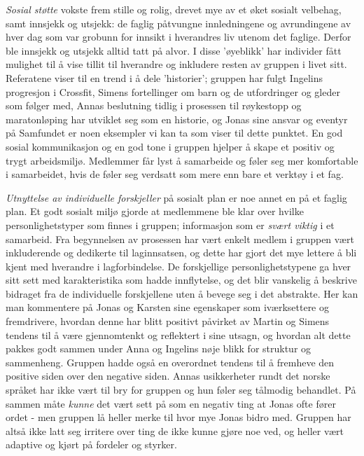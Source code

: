 \emph{Sosial støtte} vokste frem stille og rolig, drevet mye av et øket sosialt velbehag, samt innsjekk og utsjekk: de faglig påtvungne innledningene og avrundingene av hver dag som var grobunn for innsikt i hverandres liv utenom det faglige. Derfor ble innsjekk og utsjekk alltid tatt på alvor. I disse 'øyeblikk' har individer fått mulighet til å vise tillit til hverandre og inkludere resten av gruppen i livet sitt. Referatene viser til en trend i å dele 'historier'; gruppen har fulgt Ingelins progresjon i Crossfit, Simens fortellinger om barn og de utfordringer og gleder som følger med, Annas beslutning tidlig i prosessen til røykestopp og maratonløping har utviklet seg som en historie, og Jonas sine ansvar og eventyr på Samfundet er noen eksempler vi kan ta som viser til dette punktet. En god sosial kommunikasjon og en god tone i gruppen hjelper å skape et positiv og trygt arbeidsmiljø\cite{happy}. Medlemmer får lyst å samarbeide og føler seg mer komfortable i samarbeidet, hvis de føler seg verdsatt som mere enn bare et verktøy i et fag.

\emph{Utnyttelse av individuelle forskjeller} på sosialt plan er noe annet en på et faglig plan. Et godt sosialt miljø gjorde at medlemmene ble klar over hvilke personlighetstyper som finnes i gruppen; informasjon som er \emph{svært viktig} i et samarbeid. Fra begynnelsen av prosessen har vært enkelt medlem i gruppen vært inkluderende og dedikerte til laginnsatsen, og dette har gjort det mye lettere å bli kjent med hverandre i lagforbindelse. De forskjellige personlighetstypene ga hver sitt sett med karakteristika som hadde innflytelse, og det blir vanskelig å beskrive bidraget fra de individuelle forskjellene uten å bevege seg i det abstrakte. Her kan man kommentere på Jonas og Karsten sine egenskaper som iværksettere og fremdrivere, hvordan denne har blitt positivt påvirket av Martin og Simens tendens til å være gjennomtenkt og reflektert i sine utsagn, og hvordan alt dette pakkes godt sammen under Anna og Ingelins nøje blikk for struktur og sammenheng. Gruppen hadde også en overordnet tendens til å fremheve den positive siden over den negative siden. Annas usikkerheter rundt det norske språket har ikke vært til bry for gruppen og hun føler seg tålmodig behandlet. På sammen måte \emph{kunne} det vært sett på som en negativ ting at Jonas ofte fører ordet - men gruppen lå heller merke til hvor mye Jonas bidro med. Gruppen har altså ikke latt seg irritere over ting de ikke kunne gjøre noe ved, og heller vært adaptive og kjørt på fordeler og styrker. 